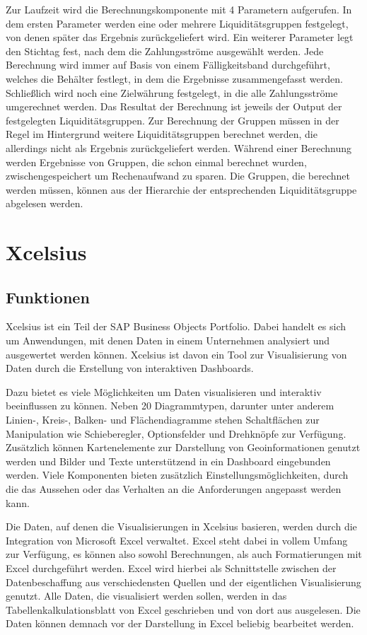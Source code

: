Zur Laufzeit wird die Berechnungskomponente mit 4 Parametern aufgerufen. In dem ersten Parameter werden eine oder mehrere Liquiditätsgruppen festgelegt, von denen später das Ergebnis zurückgeliefert wird. Ein weiterer Parameter legt den Stichtag fest, nach dem die Zahlungsströme ausgewählt werden. Jede Berechnung wird immer auf Basis von einem Fälligkeitsband durchgeführt, welches die Behälter festlegt, in dem die Ergebnisse zusammengefasst werden. Schließlich wird noch eine Zielwährung festgelegt, in die alle Zahlungsströme umgerechnet werden. Das Resultat der Berechnung ist jeweils der Output der festgelegten Liquiditätsgruppen. Zur Berechnung der Gruppen müssen in der Regel im Hintergrund weitere Liquiditätsgruppen berechnet werden, die allerdings nicht als Ergebnis zurückgeliefert werden. Während einer Berechnung werden Ergebnisse von Gruppen, die schon einmal berechnet wurden, zwischengespeichert um Rechenaufwand zu sparen. Die Gruppen, die berechnet werden müssen, können aus der Hierarchie der entsprechenden Liquiditätsgruppe abgelesen werden.

\section{Xcelsius}
\subsection{Funktionen}
Xcelsius ist ein Teil der SAP Business Objects Portfolio. Dabei handelt es sich um Anwendungen, mit denen Daten in einem Unternehmen analysiert und ausgewertet werden können. Xcelsius ist davon ein Tool zur Visualisierung von Daten durch die Erstellung von interaktiven Dashboards.

Dazu bietet es viele Möglichkeiten um Daten visualisieren und interaktiv beeinflussen zu können. Neben 20 Diagrammtypen, darunter unter anderem Linien-, Kreis-, Balken-  und Flächendiagramme stehen Schaltflächen zur Manipulation wie Schieberegler, Optionsfelder und Drehknöpfe zur Verfügung. Zusätzlich können Kartenelemente zur Darstellung von Geoinformationen genutzt werden und Bilder und Texte unterstützend in ein Dashboard eingebunden werden. Viele Komponenten bieten zusätzlich Einstellungsmöglichkeiten, durch die das Aussehen oder das Verhalten an die Anforderungen angepasst werden kann.

Die Daten, auf denen die Visualisierungen in Xcelsius basieren, werden durch die Integration von Microsoft Excel verwaltet. Excel steht dabei in vollem Umfang zur Verfügung, es können also sowohl  Berechnungen, als auch Formatierungen mit Excel durchgeführt werden. Excel wird hierbei als Schnittstelle zwischen der Datenbeschaffung aus verschiedensten Quellen und der eigentlichen Visualisierung genutzt. Alle Daten, die visualisiert werden sollen, werden in das Tabellenkalkulationsblatt von Excel geschrieben und von dort aus ausgelesen. Die Daten können demnach vor der Darstellung in Excel beliebig bearbeitet werden.

